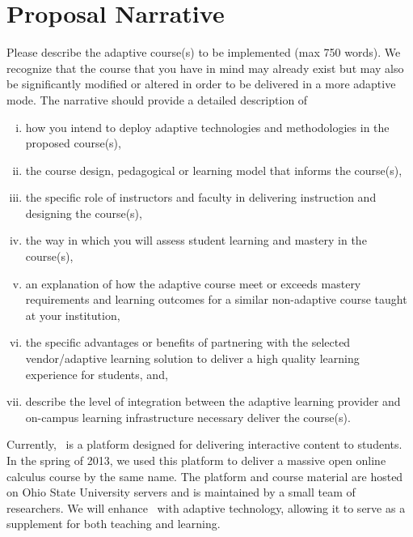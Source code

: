 \section{Proposal Narrative}


\begin{question}
Please describe the adaptive course(s) to be implemented (max 750
words). We recognize that the course that you have in mind may
already exist but may also be significantly modified or altered in
order to be delivered in a more adaptive mode. The narrative should
provide a detailed description of 
\begin{enumerate}[i.]
\item how you intend to deploy adaptive technologies and methodologies
  in the proposed course(s),
\item the course design, pedagogical or learning model that informs
  the course(s),
\item the specific role of instructors and faculty in delivering
  instruction and designing the course(s),
\item the way in which you will assess student learning and mastery in
  the course(s),
\item an explanation of how the adaptive course meet or exceeds
  mastery requirements and learning outcomes for a similar
  non-adaptive course taught at your institution,
\item the specific advantages or benefits of partnering with the
  selected vendor/adaptive learning solution to deliver a high quality
  learning experience for students, and,
\item describe the level of integration between the adaptive learning
  provider and on-campus learning infrastructure necessary deliver the
  course(s).
\end{enumerate}
\end{question}


Currently, \mooculus\ is a platform designed for delivering interactive
content to students. In the spring of 2013, we used this platform to
deliver a massive open online calculus course by the same name. The
platform and course material are hosted on Ohio State University
servers and is maintained by a small team of researchers. We will
enhance \mooculus\ with adaptive technology, allowing it to serve as a
supplement for both teaching and learning.

